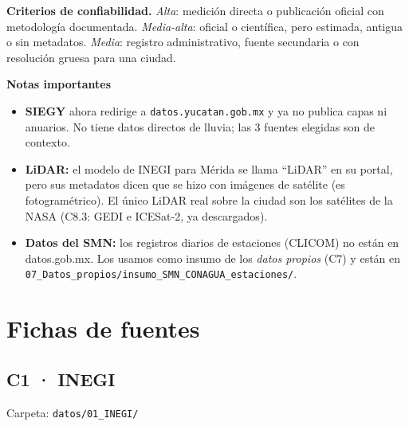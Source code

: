 \documentclass[11pt,a4paper]{article}
\begin{document}
\textbf{Criterios de confiabilidad.} \emph{Alta}: medición directa o publicación oficial con metodología documentada.
\emph{Media-alta}: oficial o científica, pero estimada, antigua o sin metadatos. \emph{Media}: registro administrativo,
fuente secundaria o con resolución gruesa para una ciudad.

\textbf{Notas importantes}
\begin{itemize}[leftmargin=1.2em,itemsep=1pt]
\item \textbf{SIEGY} ahora redirige a \texttt{datos.yucatan.gob.mx} y ya no publica capas ni anuarios. No tiene datos directos de lluvia;
  las 3 fuentes elegidas son de contexto.
\item \textbf{LiDAR:} el modelo de INEGI para Mérida se llama ``LiDAR'' en su portal, pero sus metadatos dicen que se hizo con
  imágenes de satélite (es fotogramétrico). El único LiDAR real sobre la ciudad son los satélites de la NASA (C8.3: GEDI e ICESat-2, ya descargados).
\item \textbf{Datos del SMN:} los registros diarios de estaciones (CLICOM) no están en datos.gob.mx. Los usamos como insumo de los
  \emph{datos propios} (C7) y están en \nolinkurl{07_Datos_propios/insumo_SMN_CONAGUA_estaciones/}.
\end{itemize}

\section{Fichas de fuentes}
\subsection{C1 · INEGI}
{\small\color{tinta2}Carpeta: \nolinkurl{datos/01_INEGI/}}
\end{document}
